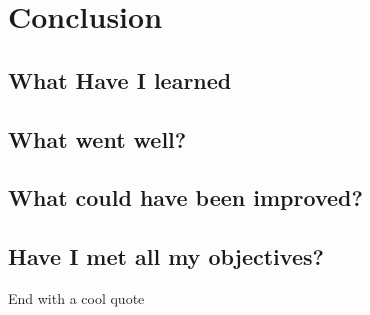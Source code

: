 \chapter{Conclusion}

\section{What Have I learned}


\section{What went well?}

\section{What could have been improved?}

\section{Have I met all my objectives?}

End with a cool quote